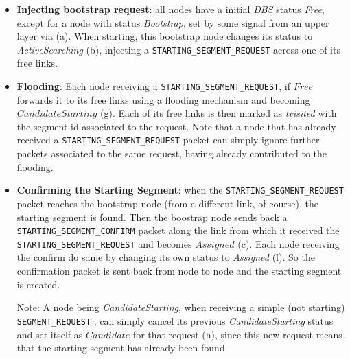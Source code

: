 \begin{itemize}

\item{\textbf{Injecting bootstrap request}}: all nodes have a initial
\emph{DBS} status \emph{Free}, except for a
 node with status \emph{Bootstrap}, set by some signal from an
upper layer via (a). When starting, this bootstrap node 
changes its status to \emph{ActiveSearching} (b), injecting a
\texttt{STARTING\_SEGMENT\_REQUEST} across one of its free links. 

\item{\textbf{Flooding}}: Each node receiving a \texttt{STARTING\_SEGMENT\_REQUEST},
if $Free$ forwards it to its free links using a flooding mechanism and
becoming $CandidateStarting$ (g).
Each of its free links is then marked as \emph{tvisited} with the segment id
associated to the request. Note that a node that has already received a
\texttt{STARTING\_SEGMENT\_REQUEST} packet can simply ignore further packets
associated to the same request, having already contributed to the
flooding. 

\item{\textbf{Confirming the Starting Segment}}: when the \texttt{STARTING\_SEGMENT\_REQUEST} packet reaches
the bootstrap node (from a different link, of course), the starting
segment is found. Then the boostrap node sends back a \texttt{STARTING\_SEGMENT\_CONFIRM}
packet along the link from which it received the
\texttt{STARTING\_SEGMENT\_REQUEST} and becomes $Assigned$ (c). Each
node receiving the confirm do same by changing its own status
to \emph{Assigned} (l). So the confirmation packet is sent back from
node to node and the starting segment is created. 

Note: A node being \emph{CandidateStarting}, when receiving a simple
(not starting) \texttt{SEGMENT\_REQUEST} , can simply cancel its
previous \emph{CandidateStarting} status and set itself as
$Candidate$ for that request (h), since this new
request means that the starting segment has already been found. 




\end{itemize}
